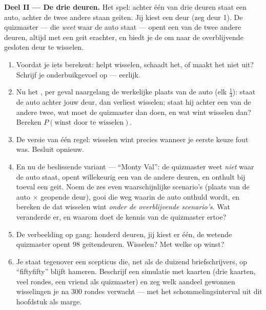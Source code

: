 \begin{problem}
\medskip
\noindent\textbf{Deel II --- De drie deuren.}
Het spel: achter één van drie deuren staat een auto, achter de twee andere
staan geiten. Jij kiest een deur (zeg deur 1). De quizmaster --- die
\emph{weet} waar de auto staat --- opent een van de twee andere deuren, altijd
met een geit erachter, en biedt je de  om naar de overblijvende gesloten
deur te wisselen.
\begin{enumerate}[resume]
  \item Voordat je iets berekent: helpt wisselen, schaadt het, of maakt het
        niet uit? Schrijf je onderbuikgevoel op --- eerlijk.
  \item Nu het , per geval naargelang de werkelijke plaats van de
        auto (elk $\frac13$): staat de auto achter jouw deur, dan verliest
        wisselen; staat hij achter een van de andere twee, wat moet de
        quizmaster dan doen, en wat wint wisselen dan? Bereken
        $P(\text{winst door te wisselen})$.
  \item De versie van één regel: wisselen wint precies wanneer je eerste
        keuze fout was. Besluit opnieuw.
  \item En nu de beslissende variant --- ``Monty Val'': de quizmaster weet
        \emph{niet} waar de auto staat, opent willekeurig een van de andere
        deuren, en onthult bij toeval een geit. Noem de zes even
        waarschijnlijke scenario's (plaats van de auto $\times$ geopende
        deur), gooi die weg waarin de auto onthuld wordt, en bereken de 
        dat wisselen wint \emph{onder de overblijvende scenario's}. Wat
        veranderde er, en waarom doet de kennis van de quizmaster ertoe?
  \item De verbeelding op gang: honderd deuren, jij kiest er één, de wetende
        quizmaster opent $98$ geitendeuren. Wisselen? Met welke  op
        winst?
  \item Je staat tegenover een scepticus die, net als de duizend
        briefschrijvers, op ``fiftyfifty'' blijft hameren. Beschrijf een
        simulatie met kaarten (drie kaarten, veel rondes, een vriend als
        quizmaster) en zeg welk aandeel gewonnen wisselingen je na $300$
        rondes verwacht --- met het schommelingsinterval uit dit hoofdstuk als
        marge.
\end{enumerate}


\end{problem}
